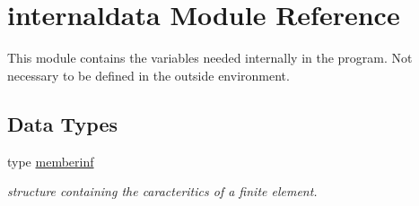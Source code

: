 \hypertarget{namespaceinternaldata}{}\section{internaldata Module Reference}
\label{namespaceinternaldata}


This module contains the variables needed internally in the program. Not necessary to be defined in the outside environment.  


\subsection*{Data Types}
\begin{DoxyCompactItemize}
\item 
type \hyperlink{structinternaldata_1_1memberinf}{memberinf}
\begin{DoxyCompactList}\small\item\em structure containing the caracteritics of a finite element. \end{DoxyCompactList}\end{DoxyCompactItemize}
